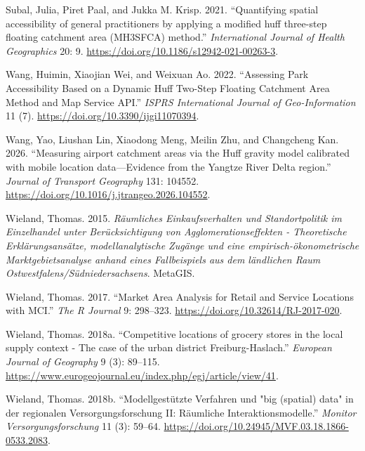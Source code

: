 \documentclass[
]{article}
\newlength{\cslhangindent}
\newenvironment{CSLReferences}[2] %
 {\begin{list}{}{%
  \setlength{\itemindent}{0pt}
  \setlength{\leftmargin}{0pt}
  \setlength{\parsep}{0pt}
  \ifodd #1
   \setlength{\leftmargin}{\cslhangindent}
   \setlength{\itemindent}{-1\cslhangindent}
  \fi
  \setlength{\itemsep}{#2\baselineskip}}}
 {\end{list}}
\begin{document}
\begin{CSLReferences}{1}{1}
Subal, Julia, Piret Paal, and Jukka M. Krisp. 2021. {``{Quantifying
spatial accessibility of general practitioners by applying a modified
huff three-step floating catchment area (MH3SFCA) method}.''}
\emph{International Journal of Health Geographics} 20: 9.
\url{https://doi.org/10.1186/s12942-021-00263-3}.

Wang, Huimin, Xiaojian Wei, and Weixuan Ao. 2022. {``{Assessing Park
Accessibility Based on a Dynamic Huff Two-Step Floating Catchment Area
Method and Map Service API}.''} \emph{ISPRS International Journal of
Geo-Information} 11 (7). \url{https://doi.org/10.3390/ijgi11070394}.

Wang, Yao, Liushan Lin, Xiaodong Meng, Meilin Zhu, and Changcheng Kan.
2026. {``{Measuring airport catchment areas via the Huff gravity model
calibrated with mobile location data---Evidence from the Yangtze River
Delta region}.''} \emph{Journal of Transport Geography} 131: 104552.
\url{https://doi.org/10.1016/j.jtrangeo.2026.104552}.

Wieland, Thomas. 2015. \emph{{Räumliches Einkaufsverhalten und
Standortpolitik im Einzelhandel unter Berücksichtigung von
Agglomerationseffekten - Theoretische Erklärungsansätze,
modellanalytische Zugänge und eine empirisch-ökonometrische
Marktgebietsanalyse anhand eines Fallbeispiels aus dem ländlichen Raum
Ostwestfalens/Südniedersachsens}}. MetaGIS.

Wieland, Thomas. 2017. {``Market Area Analysis for Retail and Service
Locations with MCI.''} \emph{The R Journal} 9: 298--323.
\url{https://doi.org/10.32614/RJ-2017-020}.

Wieland, Thomas. 2018a. {``{Competitive locations of grocery stores in
the local supply context - The case of the urban district
Freiburg-Haslach}.''} \emph{European Journal of Geography} 9 (3):
89--115.
\url{https://www.eurogeojournal.eu/index.php/egj/article/view/41}.

Wieland, Thomas. 2018b. {``{Modellgestützte Verfahren und "big (spatial)
data" in der regionalen Versorgungsforschung II: Räumliche
Interaktionsmodelle}.''} \emph{Monitor Versorgungsforschung} 11 (3):
59--64. \url{https://doi.org/10.24945/MVF.03.18.1866-0533.2083}.

\end{CSLReferences}
\end{document}
